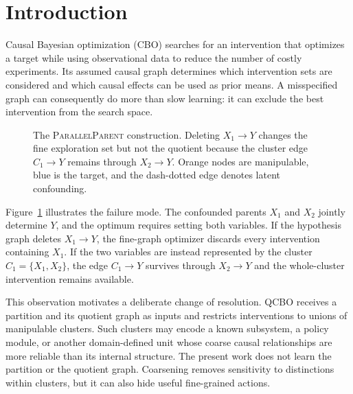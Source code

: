 \documentclass[twoside]{article}
\begin{document}


\begin{abstract}
\end{abstract}

\section{Introduction}
\label{sec:intro}

Causal Bayesian optimization (CBO)
\citep{agliettiCausalBayesianOptimization2020b} searches for an intervention
that optimizes a target while using observational data to reduce the number
of costly experiments. Its assumed causal graph determines which
intervention sets are considered and which causal effects can be used as
prior means. A misspecified graph can consequently do more than slow
learning: it can exclude the best intervention from the search space.

\begin{figure}[t]
  \centering
  
  \caption{The \textsc{ParallelParent} construction. Deleting
  $X_1\to Y$ changes the fine exploration set but not the quotient because
  the cluster edge $C_1\to Y$ remains through $X_2\to Y$. Orange nodes are
  manipulable, blue is the target, and the dash-dotted edge denotes latent
  confounding.}
  \label{fig:motivating}
\end{figure}

Figure~\ref{fig:motivating} illustrates the failure mode. The confounded
parents $X_1$ and $X_2$ jointly determine $Y$, and the optimum requires
setting both variables. If the hypothesis graph deletes $X_1\to Y$, the
fine-graph optimizer discards every intervention containing $X_1$. If the
two variables are instead represented by the cluster
$C_1=\{X_1,X_2\}$, the edge $C_1\to Y$ survives through $X_2\to Y$ and
the whole-cluster intervention remains available.

This observation motivates a deliberate change of resolution. QCBO receives
a partition and its quotient graph as inputs and restricts interventions to
unions of manipulable clusters. Such clusters may encode a known subsystem,
a policy module, or another domain-defined unit whose coarse causal
relationships are more reliable than its internal structure. The present
work does not learn the partition or the quotient graph. Coarsening removes
sensitivity to distinctions within clusters, but it can also hide useful
fine-grained actions.
\end{document}
